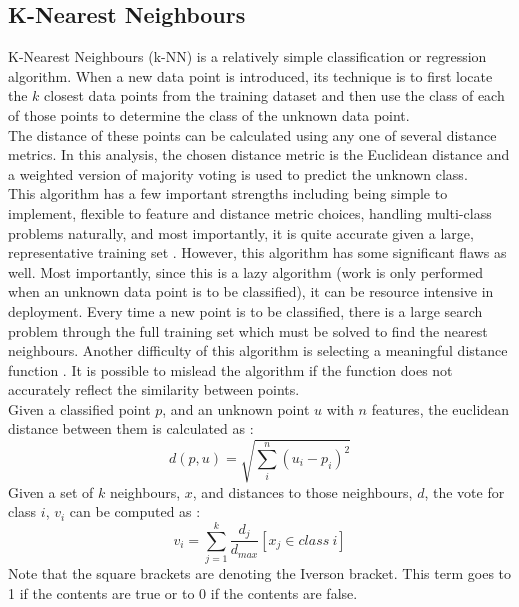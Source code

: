\documentclass[titlepage]{article}
\begin{document}
\subsection{K-Nearest Neighbours}
K-Nearest Neighbours (k-NN) is a relatively simple classification or regression algorithm. When a new data point is introduced, its technique is to first locate the $k$ closest data points from the training dataset and then use the class of each of those points to determine the class of the unknown data point.\\
The distance of these points can be calculated using any one of several distance metrics. In this analysis, the chosen distance metric is the Euclidean distance and a weighted version of majority voting is used to predict the unknown class.\\
This algorithm has a few important strengths including being simple to implement, flexible to feature and distance metric choices, handling multi-class problems naturally, and most importantly, it is quite accurate given a large, representative training set \cite{KNN}. However, this algorithm has some significant flaws as well. Most importantly, since this is a lazy algorithm (work is only performed when an unknown data point is to be classified), it can be resource intensive in deployment. Every time a new point is to be classified, there is a large search problem through the full training set which must be solved to find the nearest neighbours. Another difficulty of this algorithm is selecting a meaningful distance function \cite{KNN}. It is possible to mislead the algorithm if the function does not accurately reflect the similarity between points.\\
Given a classified point $p$, and an unknown point $u$ with $n$ features, the euclidean distance between them is calculated as \cite{KNN}: 
$$d(p, u) = \sqrt{\sum\limits_i^n(u_i - p_i)^2}$$
Given a set of $k$ neighbours, $x$, and distances to those neighbours, $d$, the vote for class $i$, $v_i$ can be computed as \cite{KNN}:
$$v_i = \sum\limits_{j=1}^{k} \frac{d_j}{d_{max}} \left[x_j \in class~i\right]$$
Note that the square brackets are denoting the Iverson bracket. This term goes to 1 if the contents are true or to 0 if the contents are false.
\end{document}
